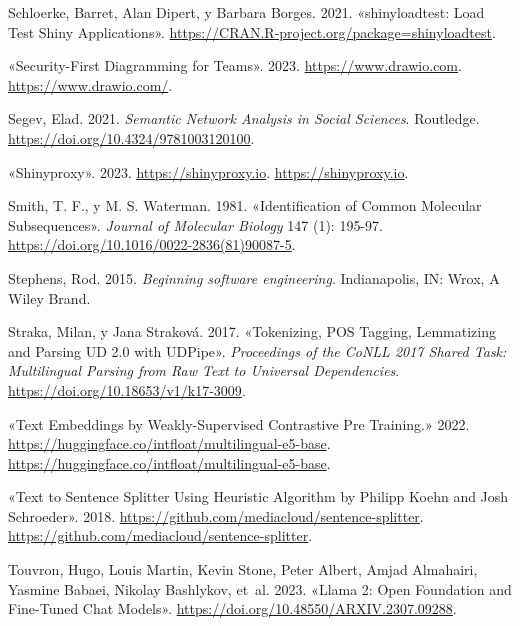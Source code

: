\documentclass[
  12pt,
  openany]{book}
\newlength{\cslhangindent}
\newlength{\cslentryspacingunit} %
\newenvironment{CSLReferences}[2] %
 {%
  \setlength{\parindent}{0pt}
  \ifodd #1
  \let\oldpar\par
  \def\par{\hangindent=\cslhangindent\oldpar}
  \fi
  \setlength{\parskip}{#2\cslentryspacingunit}
 }%
 {}
\begin{document}
\begin{CSLReferences}{1}{0}
\leavevmode{}%
Schloerke, Barret, Alan Dipert, y Barbara Borges. 2021. {«shinyloadtest: Load Test Shiny Applications»}. \url{https://CRAN.R-project.org/package=shinyloadtest}.

\leavevmode{}%
{«Security-First Diagramming for Teams»}. 2023. \url{https://www.drawio.com}. \url{https://www.drawio.com/}.

\leavevmode{}%
Segev, Elad. 2021. \emph{Semantic Network Analysis in Social Sciences}. Routledge. \url{https://doi.org/10.4324/9781003120100}.

\leavevmode{}%
{«Shinyproxy»}. 2023. \url{https://shinyproxy.io}. \url{https://shinyproxy.io}.

\leavevmode{}%
Smith, T. F., y M. S. Waterman. 1981. {«Identification of Common Molecular Subsequences»}. \emph{Journal of Molecular Biology} 147 (1): 195-97. \url{https://doi.org/10.1016/0022-2836(81)90087-5}.

\leavevmode{}%
Stephens, Rod. 2015. \emph{Beginning software engineering}. Indianapolis, IN: Wrox, A Wiley Brand.

\leavevmode{}%
Straka, Milan, y Jana Straková. 2017. {«Tokenizing, POS Tagging, Lemmatizing and Parsing UD 2.0 with UDPipe»}. \emph{Proceedings of the CoNLL 2017 Shared Task: Multilingual Parsing from Raw Text to Universal Dependencies}. \url{https://doi.org/10.18653/v1/k17-3009}.

\leavevmode{}%
{«Text Embeddings by Weakly-Supervised Contrastive Pre Training.»} 2022. \url{https://huggingface.co/intfloat/multilingual-e5-base}. \url{https://huggingface.co/intfloat/multilingual-e5-base}.

\leavevmode{}%
{«Text to Sentence Splitter Using Heuristic Algorithm by Philipp Koehn and Josh Schroeder»}. 2018. \url{https://github.com/mediacloud/sentence-splitter}. \url{https://github.com/mediacloud/sentence-splitter}.

\leavevmode{}%
Touvron, Hugo, Louis Martin, Kevin Stone, Peter Albert, Amjad Almahairi, Yasmine Babaei, Nikolay Bashlykov, et~al. 2023. {«Llama 2: Open Foundation and Fine-Tuned Chat Models»}. \url{https://doi.org/10.48550/ARXIV.2307.09288}.


\end{CSLReferences}
\end{document}
